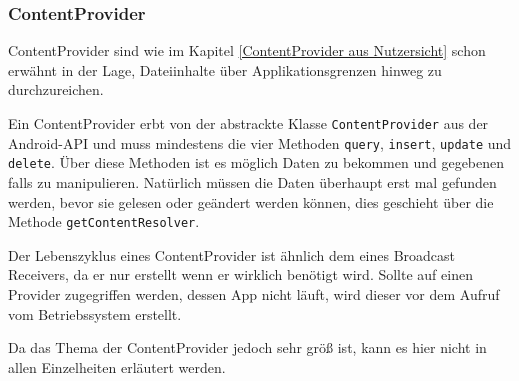 \subsubsection{ContentProvider}
ContentProvider sind wie im Kapitel \ref{ContentProvider aus Nutzersicht} schon erw\"ahnt in der Lage, Dateiinhalte \"uber Applikationsgrenzen hinweg zu durchzureichen.

Ein ContentProvider erbt von der abstrackte Klasse \texttt{ContentProvider} aus der Android-API und muss mindestens die vier Methoden \texttt{query}, \texttt{insert}, \texttt{update} und \texttt{delete}. \"Uber diese Methoden ist es m\"oglich Daten zu bekommen und gegebenen falls zu manipulieren. Nat\"urlich m\"ussen die Daten \"uberhaupt erst mal gefunden werden, bevor sie gelesen oder ge\"andert werden k\"onnen, dies geschieht \"uber die Methode \texttt{getContentResolver}. \cite{Kuehn12}

Der Lebenszyklus eines ContentProvider ist \"ahnlich dem eines Broadcast Receivers, da er nur erstellt wenn er wirklich ben\"otigt wird. Sollte auf einen Provider zugegriffen werden, dessen App nicht l\"auft, wird dieser vor dem Aufruf vom Betriebssystem erstellt.

Da das Thema der ContentProvider jedoch sehr gr\"o\ss{} ist, kann es hier nicht in allen Einzelheiten erl\"autert werden. 